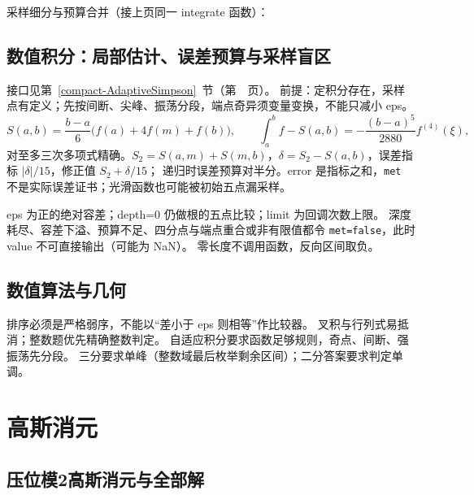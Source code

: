 \Needspace{453pt}



\newpage

\noindent 采样细分与预算合并（接上页同一 integrate 函数）：



\newpage

\subsection{数值积分：局部估计、误差预算与采样盲区}\label{knowledge-adaptive-integration}
接口见第~\ref{compact-AdaptiveSimpson}~节（第~\pageref{compact-AdaptiveSimpson}~页）。
前提：定积分存在，采样点有定义；先按间断、尖峰、振荡分段，端点奇异须变量变换，不能只减小 eps。
\[
S(a,b)=\frac{b-a}{6}\bigl(f(a)+4f(m)+f(b)\bigr),\qquad
\int_a^bf-S(a,b)=-\frac{(b-a)^5}{2880}f^{(4)}(\xi),
\]
对至多三次多项式精确。$S_2=S(a,m)+S(m,b)$，$\delta=S_2-S(a,b)$，误差指标 $|\delta|/15$，修正值 $S_2+\delta/15$；
递归时误差预算对半分。error 是指标之和，\texttt{met} 不是实际误差证书；光滑函数也可能被初始五点漏采样。

eps 为正的绝对容差；depth=0 仍做根的五点比较；limit 为回调次数上限。
深度耗尽、容差下溢、预算不足、四分点与端点重合或非有限值都令 \texttt{met=false}，此时 value 不可直接输出（可能为 NaN）。
零长度不调用函数，反向区间取负。


\subsection{数值算法与几何}\label{knowledge-numerical-boundaries}
排序必须是严格弱序，不能以“差小于 eps 则相等”作比较器。
叉积与行列式易抵消；整数题优先精确整数判定。
自适应积分要求函数足够规则，奇点、间断、强振荡先分段。
三分要求单峰（整数域最后枚举剩余区间）；二分答案要求判定单调。



\Needspace{180pt}

\section{高斯消元}

\subsection{压位模2高斯消元与全部解}\label{compact-GaussXor}

